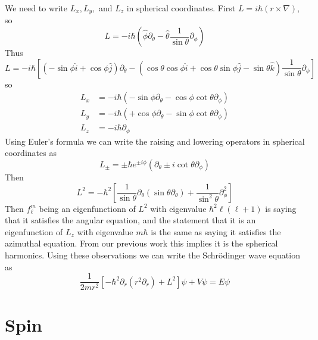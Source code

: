 \documentclass[12pt, a4paper, oneside, openright, titlepage]{book}
\begin{document}
We need to write $L_x,L_y,$ and $L_z$ in spherical coordinates. First $L = i\hbar(r\times \nabla)$, so \begin{equation*}
    L = -i\hbar\left(\hat{\phi}\partial_{\theta} - \hat{\theta}\frac{1}{\sin\theta}\partial_{\phi}\right)
\end{equation*}
Thus \begin{equation*}
    L = -i\hbar\left[(-\sin\phi\hat{i}+\cos\phi\hat{j})\partial_{\theta}-(\cos\theta\cos\phi\hat{i}+\cos\theta\sin\phi\hat{j}-\sin\theta\hat{k})\frac{1}{\sin\theta}\partial_{\phi}\right]
\end{equation*}
so \begin{align*}
    L_x &= -i\hbar(-\sin\phi\partial_{\theta} - \cos\phi\cot\theta\partial_{\phi}) \\
    L_y &= -i\hbar(+\cos\phi\partial_{\theta} - \sin\phi\cot\theta\partial_{\phi}) \\
    L_z &= -i\hbar\partial_{\phi}
\end{align*}
Using Euler's formula we can write the raising and lowering operators in spherical coordinates as \begin{equation*}
    L_{\pm} = \pm\hbar e^{\pm i\phi}(\partial_{\theta}\pm i\cot\theta\partial_{\phi})
\end{equation*}
Then \begin{equation*}
    L^2 = -\hbar^2\left[\frac{1}{\sin\theta}\partial_{\theta}(\sin\theta\partial_{\theta}) + \frac{1}{\sin^2\theta}\partial_{\phi}^2\right]
\end{equation*}
Then $f_{\ell}^m$ being an eigenfunctionn of $L^2$ with eigenvalue $\hbar^2\ell(\ell+1)$ is saying that it satisfies the angular equation, and the statement that it is an eigenfunction of $L_z$ with eigenvalue $m\hbar$ is the same as saying it satisfies the azimuthal equation. From our previous work this implies it is the spherical harmonics. Using these observations we can write the Schr\"{o}dinger wave equation as \begin{equation*}
    \frac{1}{2mr^2}\left[-\hbar^2\partial_r(r^2\partial_r) + L^2\right]\psi + V\psi = E\psi
\end{equation*}


\section{Spin}
\end{document}
